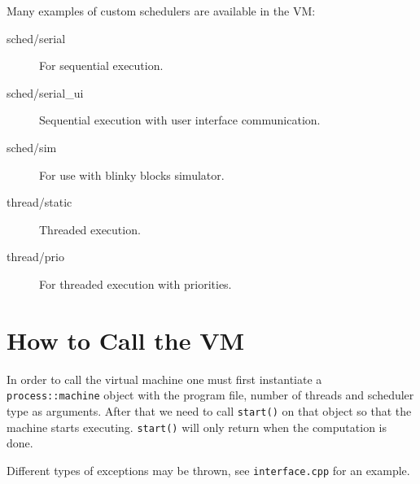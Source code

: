 \documentclass[11pt]{article}
\begin{document}
Many examples of custom schedulers are available in the VM:

\begin{description}
   \item[sched/serial] For sequential execution.
   \item[sched/serial\_ui] Sequential execution with user interface communication.
   \item[sched/sim] For use with blinky blocks simulator.
   \item[thread/static] Threaded execution.
   \item[thread/prio] For threaded execution with priorities.
\end{description}

\section{How to Call the VM}

In order to call the virtual machine one must first instantiate a \texttt{process::machine} object with the program file, number of threads and scheduler type as arguments. After that we need to call \texttt{start()} on that object so that the machine starts executing. \texttt{start()} will only return when the computation is done.

Different types of exceptions may be thrown, see \texttt{interface.cpp} for an example.
\end{document}
